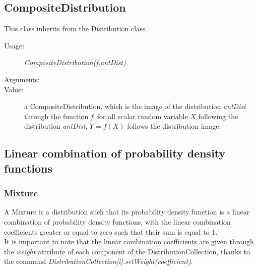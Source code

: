 

\newpage
\subsection{CompositeDistribution}


This class inherits from the Distribution class.


\begin{description}

\item[Usage:]  \textit{CompositeDistribution(f,antDist)}

\item[Arguments:]  \rule{0pt}{1em}

\item[Value:] a CompositeDistribution, which is the image of the distribution {\itshape antDist} through the function {\itshape f}:  for all scalar random variable $X$ following the distribution {\itshape antDist}, $Y=f(X)$ follows the distribution image. 


\end{description}


\newpage
\subsection{Linear combination of probability density functions}

\subsubsection{Mixture}

A Mixture is a distribution such that its probability density function is a linear combination of probability density functions, with the linear combination coefficients greater or equal to zero such that their sum is equal to 1. \\
It is important to note that the linear combination coefficients are given through the {\itshape weight} attribute of each component of the DistributionCollection, thanks to the command {\itshape DistributionCollection[i].setWeight(coefficient)}.

